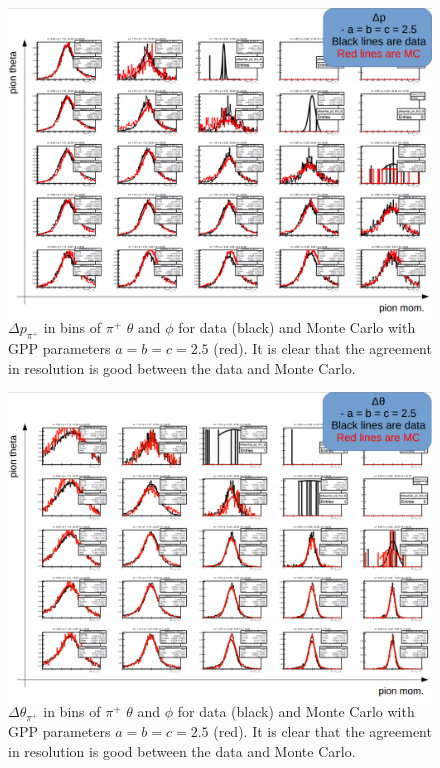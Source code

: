 \begin{figure}
\centering
\includegraphics[width=8.5in]{figures/DeltapRes_dataAndMC.png}
\caption{$\Delta p_{\pi^+}$ in bins of $\pi^+$ $\theta$ and $\phi$ for data (black) and Monte Carlo with GPP parameters $a = b = c = 2.5$ (red). It is clear that the agreement in resolution is good between the data and Monte Carlo.}
\label{fig:DeltapRes_dataAndMC}
\end{figure}
%
\begin{figure}
\centering
\includegraphics[width=8.5in]{figures/DeltaThetaRes_dataAndMC.png}
\caption{$\Delta \theta_{\pi^+}$ in bins of $\pi^+$ $\theta$ and $\phi$ for data (black) and Monte Carlo with GPP parameters $a = b = c = 2.5$ (red). It is clear that the agreement in resolution is good between the data and Monte Carlo.}
\label{fig:DeltaThetaRes_dataAndMC}
\end{figure}
